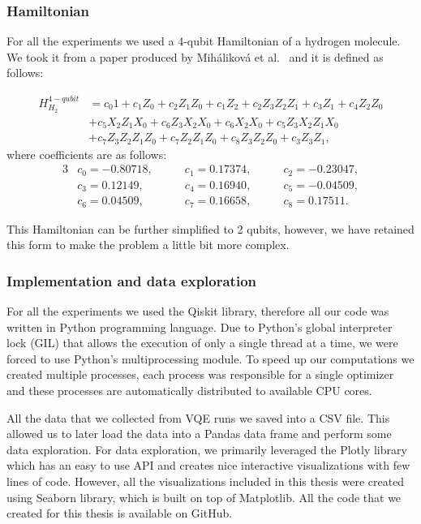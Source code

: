 \subsubsection{Hamiltonian}
For all the experiments we used a 4-qubit Hamiltonian of a hydrogen molecule. We took it from a paper produced by Miháliková et al.~\cite{mihalikova} and it is defined as follows:

\begin{align*}H_{H_2}^{4-qubit} &= c_{0}1 + c_{1}Z_{0} + c_{2}Z_{1}Z_{0} + c_{1}Z_{2} + c_{2}Z_{3}Z_{2}Z_{1} + c_{3}Z_{1} + c_{4}Z_{2}Z_{0}\\
                                &+ c_{5}X_{2}Z_{1}X_{0} + c_{6}Z_{3}X_{2}X_{0} + c_{6}X_{2}X_{0} + c_{5}Z_{3}X_{2}Z_{1}X_{0}\\
                                &+c_{7}Z_{3}Z_{2}Z_{1}Z_{0} + c_{7}Z_{2}Z_{1}Z_{0} + c_{8}Z_{3}Z_{2}Z_{0} + c_{3}Z_{3}Z_{1},
\end{align*}
where coefficients are as follows:
\begin{alignat*}{3}
    &c_0 = -0.80718,\qquad &c_1 = 0.17374,\qquad &c_2 =-0.23047, \\
    &c_3 = 0.12149,\qquad  &c_4 = 0.16940,\qquad &c_5 = -0.04509, \\
    &c_6 = 0.04509,\qquad  &c_7 = 0.16658,\qquad &c_8 = 0.17511.
\end{alignat*}

This Hamiltonian can be further simplified to 2 qubits, however, we have retained this form to make the problem a little bit more complex. 

\subsubsection{Implementation and data exploration}
For all the experiments we used the Qiskit library, therefore all our code was written in Python programming language. Due to Python's global interpreter lock (GIL) that allows the execution of only a single thread at a time, we were forced to use Python's multiprocessing module. To speed up our computations we created multiple processes, each process was responsible for a single optimizer and these processes are automatically distributed to available CPU cores.

All the data that we collected from VQE runs we saved into a CSV file. This allowed us to later load the data into a Pandas data frame and perform some data exploration. For data exploration, we primarily leveraged the Plotly library which has an easy to use API and creates nice interactive visualizations with few lines of code. However, all the visualizations included in this thesis were created using Seaborn library, which is built on top of Matplotlib. All the code that we created for this thesis is available on GitHub. 


